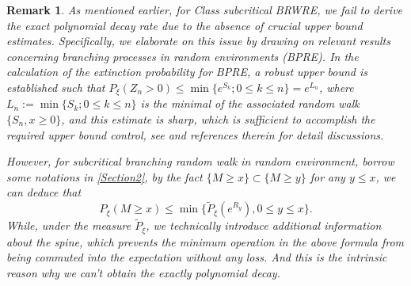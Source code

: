 \documentclass[]{article}
\numberwithin{equation}{section}
\theoremstyle{thmstyleone}%
\theoremstyle{thmstyletwo}%
\newtheorem{remark}{Remark}%
\theoremstyle{thmstylethree}%
\theoremstyle{thmstylefour}%
\theoremstyle{thmstylefive}%
\theoremstyle{thmstylesix}%
\begin{document}
	\begin{remark}\label{R final}
		As mentioned earlier, for Class  subcritical BRWRE, we fail to derive the exact polynomial decay rate due to the absence of crucial upper bound estimates. Specifically, we elaborate on this issue by drawing on relevant results concerning branching processes in random environments (BPRE). In the calculation of the extinction probability for BPRE, a robust upper bound is established such that $ P_\xi(Z_n>0)\leqslant \min \{e^{S_k};0\leqslant k\leqslant n\} = e^{L_n} $, where $L_n:=\min\{S_k;0\leqslant k\leqslant n\}$ is the minimal of the associated random walk $\{S_n,x\geqslant 0\}$, and this estimate is sharp, which is sufficient to accomplish the required upper bound control, see \cite{Geiger2003,B2} and references therein for detail discussions.
		
		However, for subcritical branching random walk in random environment, borrow some notations in \cref{Section2}, by the fact $\{M\geqslant x\}\subset \{M\geqslant y\}$ for any $y\leqslant x$, we can deduce that
		\[
		P_\xi\left(M\geqslant x\right) \leqslant 
		\min \{
		\tilde{P}_\xi \left(e^{R_y}\right),0\leqslant y\leqslant x
		\}.
		\]
		While, under the measure \(\tilde{P}_\xi\), we technically introduce additional information about the spine, which prevents the minimum operation in the above formula from being commuted into the expectation without any loss. And this is the intrinsic reason why we can't obtain the exactly polynomial decay.
	\end{remark}
	
	
	
	
	
\end{document}
